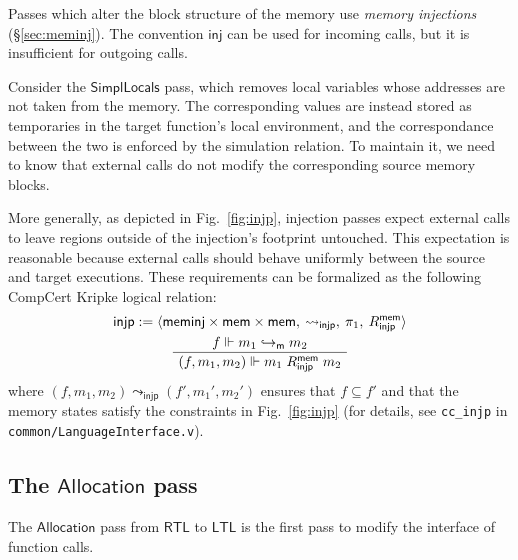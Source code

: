 \documentclass[acmsmall,authordraft]{acmart}
\newcommand{\kw}[1]{\ensuremath{ \mathsf{#1} }}
\begin{document}
Passes which alter the block structure of the memory
use \emph{memory injections} (\S\ref{sec:meminj}).
The convention \kw{inj} can be used for incoming calls,
but it is insufficient for outgoing calls.

Consider the \kw{SimplLocals} pass,
which removes local variables whose addresses are not taken
from the memory.
The corresponding values are instead stored
as temporaries in the target function's local environment,
and the correspondance between the two
is enforced by the simulation relation.
To maintain it,
we need to know that
external calls do not modify
the corresponding source memory blocks.

More generally,
as depicted in Fig.~\ref{fig:injp},
injection passes expect external calls
to leave regions outside of the injection's footprint untouched.
This expectation is reasonable because
external calls
should behave uniformly between the source and target executions.
These requirements can be formalized as the
following CompCert Kripke logical relation:
\begin{gather*}
  \kw{injp} :=
    \langle
      \kw{meminj} \times \kw{mem} \times \kw{mem}, \:
      {\leadsto_\kw{injp}}, \:
      \pi_1, \:
      R^\kw{mem}_\kw{injp}
    \rangle
  \\
  \AxiomC{$f \Vdash m_1 \hookrightarrow_\kw{m} m_2$}
  \UnaryInfC{$(f, m_1, m_2) \Vdash m_1 \mathrel{R^\kw{mem}_\kw{injp}} m_2$}
  \DisplayProof
\end{gather*}
where $(f, m_1, m_2) \leadsto_\kw{injp} (f', m_1', m_2')$
ensures that $f \subseteq f'$ and that the memory states
satisfy the constraints in Fig.~\ref{fig:injp}
(for details,
see \texttt{cc\_injp} in \texttt{common/LanguageInterface.v}).


\subsection{The \kw{Allocation} pass} %

The \kw{Allocation} pass from \kw{RTL} to \kw{LTL}
is the first pass to modify the interface of function calls.
\end{document}
